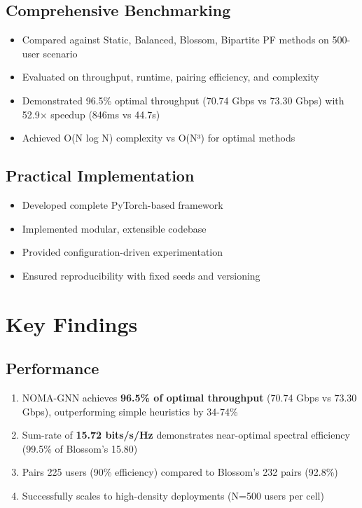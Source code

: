 \subsection{Comprehensive Benchmarking}
\begin{itemize}
    \item Compared against Static, Balanced, Blossom, Bipartite PF methods on 500-user scenario
    \item Evaluated on throughput, runtime, pairing efficiency, and complexity
    \item Demonstrated 96.5\% optimal throughput (70.74 Gbps vs 73.30 Gbps) with 52.9× speedup (846ms vs 44.7s)
    \item Achieved O(N log N) complexity vs O(N³) for optimal methods
\end{itemize}

\subsection{Practical Implementation}
\begin{itemize}
    \item Developed complete PyTorch-based framework
    \item Implemented modular, extensible codebase
    \item Provided configuration-driven experimentation
    \item Ensured reproducibility with fixed seeds and versioning
\end{itemize}

\section{Key Findings}

\subsection{Performance}
\begin{enumerate}
    \item NOMA-GNN achieves \textbf{96.5\% of optimal throughput} (70.74 Gbps vs 73.30 Gbps), outperforming simple heuristics by 34-74\%
    \item Sum-rate of \textbf{15.72 bits/s/Hz} demonstrates near-optimal spectral efficiency (99.5\% of Blossom's 15.80)
    \item Pairs 225 users (90\% efficiency) compared to Blossom's 232 pairs (92.8\%)
    \item Successfully scales to high-density deployments (N=500 users per cell)
\end{enumerate}

